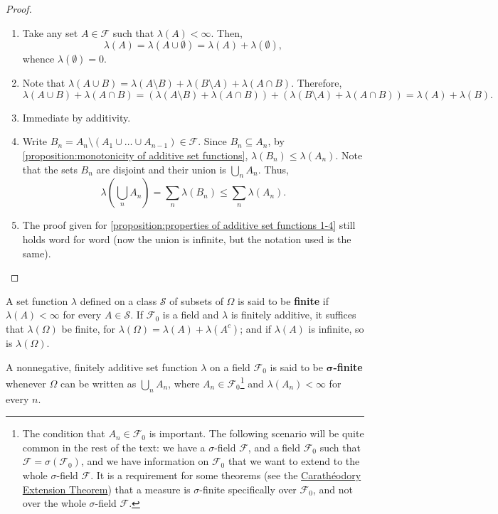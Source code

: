 \begin{proof}
		\begin{enumerate}
			\item Take any set \(A\in\mathcal{F}\) such that \(\lambda(A)<\infty\). Then,
			\[
					\lambda(A)=\lambda(A\cup\emptyset)=\lambda(A)+\lambda(\emptyset)
			,\]
			whence \(\lambda(\emptyset)=0\).
			\item Note that \(\lambda(A\cup B)=\lambda(A\setminus B)+\lambda(B\setminus A)+\lambda(A\cap B)\). Therefore,
			\[
					\lambda(A\cup B)+\lambda(A\cap B)=\left(\lambda(A\setminus B)+\lambda(A\cap B)\right)+\left(\lambda(B\setminus A)+\lambda(A\cap B)\right)=\lambda(A)+\lambda(B).
			\]
			\item Immediate by additivity.
			\item Write \(B_{n}=A_{n}\setminus \left(A_{1}\cup\dots\cup A_{n-1}\right)\in\mathcal{F}\). Since \(B_{n}\subseteq A_{n}\), by \ref{proposition:monotonicity of additive set functions}, \(\lambda(B_{n})\leq\lambda(A_{n})\). Note that the sets \(B_{n}\)
are disjoint and their union is \(\bigcup_{n}A_{n}\). Thus,
			\[ \lambda\left(\bigcup_{n}A_{n}\right)=\sum_{n}\lambda(B_{n})\leq\sum_{n}\lambda(A_{n}).
			\]
	\item The proof given for \ref{proposition:properties of additive set functions 1-4} still holds word for word (now the union is infinite, but the notation used is the same).
		\end{enumerate}
\end{proof}
\begin{defn} A set function \(\lambda\) defined on a class \(\mathcal{S}\) of
subsets of \(\Omega\) is said to be \textbf{finite} if \(\lambda(A)<\infty\) for
every \(A\in\mathcal{S}\). If \(\mathcal{F}_0\) is a field and \(\lambda\) is finitely additive, it
suffices that \(\lambda(\Omega)\) be finite, for
\(\lambda(\Omega)=\lambda(A)+\lambda(A^{c})\); and if \(\lambda(A)\) is infinite,
so is \(\lambda(\Omega)\).
		
A nonnegative, finitely additive set function \(\lambda\) on a field
\(\mathcal{F}_0\) is said to be \(\bm{\sigma}\)\textbf{-finite} whenever \(\Omega\) can be
written as \(\bigcup_{n}A_{n}\), where \(A_n\in\mathcal{F}_0\)\footnote{The condition that \(A_n\in\mathcal{F}_0\) is important. The following scenario will be quite common in the rest of the text: we have a \(\sigma\)-field \(\mathcal{F}\), and a field \(\mathcal{F}_0\) such that \(\mathcal{F}=\sigma(\mathcal{F}_0)\), and we have information on \(\mathcal{F}_0\) that we want to extend to the whole \(\sigma\)-field \(\mathcal{F}\). It is a requirement for some theorems (see the \hyperref[theorem:Caratheodory Extension]{Carathéodory Extension Theorem}) that a measure is \(\sigma\)-finite specifically over \(\mathcal{F}_0\), and not over the whole \(\sigma\)-field \(\mathcal{F}\).} and \(\lambda(A_{n})<\infty\) for every \(n\).
\end{defn}
